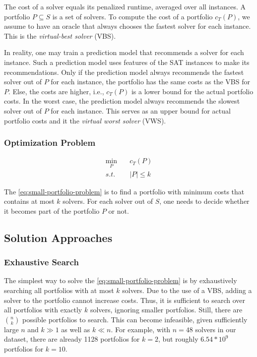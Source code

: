 \documentclass[conference]{IEEEtran}
\begin{document}
The cost of a solver equals its penalized runtime, averaged over all instances.
A portfolio $P \subseteq S$ is a set of solvers.
To compute the cost of a portfolio $c_{T}(P)$, we assume to have an oracle that always chooses the fastest solver for each instance.
This is the \emph{virtual-best solver} (VBS).

In reality, one may train a prediction model that recommends a solver for each instance.
Such a prediction model uses features of the SAT instances to make its recommendations.
Only if the prediction model always recommends the fastest solver out of $P$ for each instance, the portfolio has the same costs as the VBS for $P$.
Else, the costs are higher, i.e., $c_{T}(P)$ is a lower bound for the actual portfolio costs.
In the worst case, the prediction model always recommends the slowest solver out of $P$ for each instance.
This serves as an upper bound for actual portfolio costs and it the \emph{virtual worst solver} (VWS).

\subsubsection{Optimization Problem}

\begin{equation}
	\label{eq:small-portfolio-problem}
	\begin{aligned}
		\min_P \quad & c_{T}(P)\\
		s.t. \quad & |P| \leq k
	\end{aligned}
   \tag{Small-Portfolio Problem}
\end{equation}

The \ref{eq:small-portfolio-problem} is to find a portfolio with minimum costs that contains at most $k$ solvers.
For each solver out of $S$, one needs to decide whether it becomes part of the portfolio $P$ or not.

\subsection{Solution Approaches}
\label{sec:approach:solution}

\subsubsection{Exhaustive Search}

The simplest way to solve the \ref{eq:small-portfolio-problem} is by exhaustively searching all portfolios with at most $k$ solvers.
Due to the use of a VBS, adding a solver to the portfolio cannot increase costs.
Thus, it is sufficient to search over all portfolios with exactly $k$ solvers, ignoring smaller portfolios.
Still, there are $\binom{n}{k}$ possible portfolios to search.
This can become infeasible, given sufficiently large $n$ and $k \gg 1$ as well as $k \ll n$.
For example, with $n=48$ solvers in our dataset, there are already 1128 portfolios for $k=2$, but roughly $6.54 * 10^9$ portfolios for $k=10$.
\end{document}
